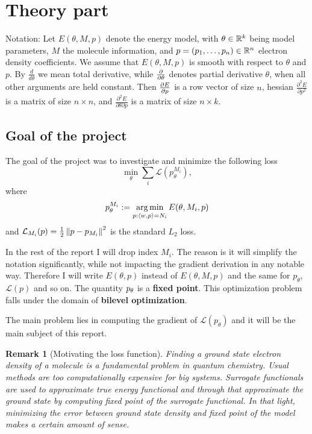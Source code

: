 \documentclass[a4paper,10pt]{report}
\newtheorem{remark}{Remark}
\begin{document}
\newpage

\section{Theory part}
Notation: Let $E(\theta, M ,p)$ denote the energy model, with $\theta \in \mathbb{R}^k$ being model parameters, $M$ the molecule information, and $p=(p_1, \ldots ,p_n )\in \mathbb{R}^n$ electron density coefficients.  We assume that $E(\theta, M ,p)$ is smooth with respect to $\theta$ and $p$.
By $\frac{d}{d\theta}$ we mean total derivative, while $\frac{\partial }{\partial \theta}$ denotes partial derivative $\theta$, when all other arguments are held constant. Then $\frac{\partial E}{\partial p}$ is a row vector of size $n$, hessian $\frac{\partial^2 E}{ \partial p^2 }$ is a matrix of size $n \times n$, and $\frac{\partial^2 E}{\partial \theta \partial p}$ is a matrix of size $n \times k $.


\subsection{Goal of the project}
The goal of the project was to investigate and minimize the following loss
\begin{equation}\label{bilevel}
 \min_\theta \sum_i \mathcal{L}(p_{\theta}^{M_i}),
\end{equation}
where
\begin{equation}
  p_\theta^{M_i}:=\operatorname*{arg\,min}_{p : \langle w, p \rangle=N_i} E(\theta,M_i,p)
\end{equation}
and $\mathcal{L}_{M_i}(p) = \frac{1}{2}\left\|p-p_{M_i}\right\|^2$ is the standard $L_2$ loss.

In the rest of the report I will drop index $M_i$. The reason is it will simplify the notation significantly, while not impacting the gradient derivation in any notable way.
Therefore I will write $E(\theta,p)$ instead of $E(\theta,M,p)$ and the same for $p_\theta$, $\mathcal{L}(p)$ and so on.
The quantity $p_\theta$ is a \textbf{fixed point}.
This optimization problem falls under the domain of \textbf{bilevel optimization}.

The main problem lies in computing the gradient of $\mathcal{L}(p_\theta)$ and it will be the main subject of this report.

\begin{remark}[Motivating the loss function] Finding a ground state electron density of a molecule is a fundamental problem in quantum chemistry. Usual methods are too computationally expensive for big systems. Surrogate functionals are used to approximate true energy functional and through that approximate the ground state by computing fixed point of the surrogate functional. In that light, minimizing the error between ground state density and fixed point of the model makes a certain amount of sense.
\end{remark}
\end{document}
